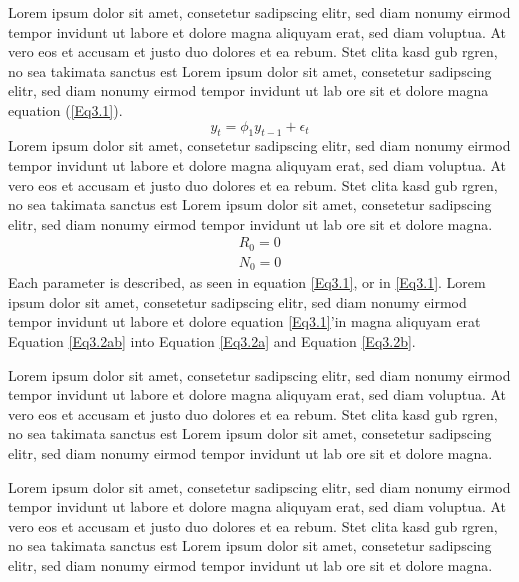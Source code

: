 Lorem ipsum dolor sit amet, consetetur sadipscing elitr, sed diam nonumy eirmod tempor invidunt ut labore et dolore magna aliquyam erat, sed diam voluptua. At vero eos et accusam et justo duo dolores et ea rebum. Stet clita kasd gub rgren, no sea takimata sanctus est  Lorem ipsum dolor sit amet, consetetur sadipscing elitr, sed diam nonumy eirmod tempor invidunt ut lab  ore sit et dolore magna equation (\ref{Eq3.1}).
\begin{equation}
y_{t} = \phi_{1} y_{t-1} + \epsilon_{t}
\label{Eq3.1}
\end{equation}
Lorem ipsum dolor sit amet, consetetur sadipscing elitr, sed diam nonumy eirmod tempor invidunt ut labore et dolore magna aliquyam erat, sed diam voluptua. At vero eos et accusam et justo duo dolores et ea rebum. Stet clita kasd gub rgren, no sea takimata sanctus est Lorem ipsum dolor sit amet, consetetur sadipscing elitr, sed diam nonumy eirmod tempor invidunt ut lab ore sit et dolore magna.
\vskip -24pt
\begin{subequations}
	\begin{gather}
	R_0 = 0 \label{Eq3.2a}\\
	N_0 = 0 \label{Eq3.2b}
	\end{gather}
	\label{Eq3.2ab}
\end{subequations}
\vskip -24pt
Each parameter is described, as seen in equation \eqref{Eq3.1}, or in \ref{Eq3.1}. Lorem ipsum dolor sit amet, consetetur sadipscing elitr, sed diam nonumy eirmod tempor invidunt ut labore et dolore equation \ref{Eq3.1}’in magna aliquyam erat Equation \eqref{Eq3.2ab} into Equation \eqref{Eq3.2a} and Equation \eqref{Eq3.2b}.


Lorem ipsum dolor sit amet, consetetur sadipscing elitr, sed diam nonumy eirmod tempor invidunt ut labore et dolore magna aliquyam erat, sed diam voluptua. At vero eos et accusam et justo duo dolores et ea rebum. Stet clita kasd gub rgren, no sea takimata sanctus est Lorem ipsum dolor sit amet, consetetur sadipscing elitr, sed diam nonumy eirmod tempor invidunt ut lab ore sit et dolore magna.

Lorem ipsum dolor sit amet, consetetur sadipscing elitr, sed diam nonumy eirmod tempor invidunt ut labore et dolore magna aliquyam erat, sed diam voluptua. At vero eos et accusam et justo duo dolores et ea rebum. Stet clita kasd gub rgren, no sea takimata sanctus est Lorem ipsum dolor sit amet, consetetur sadipscing elitr, sed diam nonumy eirmod tempor invidunt ut lab ore sit et dolore magna.

